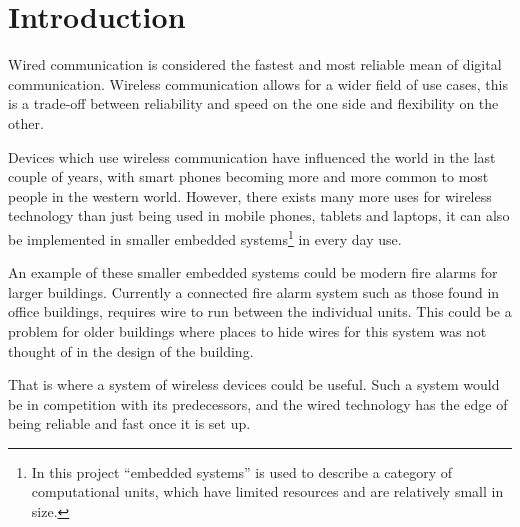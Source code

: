 \chapter{Introduction}
\vspace{-20pt}
Wired communication is considered the fastest and  most reliable mean of digital communication.
Wireless communication allows for a wider field of use cases, this is a trade-off between reliability and speed on the one side and flexibility on the other. \cite{wirelessTradeoffs}

Devices which use wireless communication have influenced the world in the last couple of years, with smart phones becoming more and more common to most people in the western world. \cite{2013-SmartPhoneUse}
However, there exists many more uses for wireless technology than just being used in mobile phones, tablets and laptops, it can also be implemented in smaller embedded systems\footnote{In this project \enquote{embedded systems} is used to describe a category of computational units, which have limited resources and are relatively small in size. } in every day use.



An example of these smaller embedded systems could be modern fire alarms for larger buildings.
Currently a connected fire alarm system such as those found in office buildings, requires wire to run between the individual units.
This could be a problem for older buildings where places to hide wires for this system was not thought of in the design of the building.

That is where a system of wireless devices could be useful. 
Such a system would be in competition with its predecessors, and the wired technology has the edge of being reliable and fast once it is set up. 

